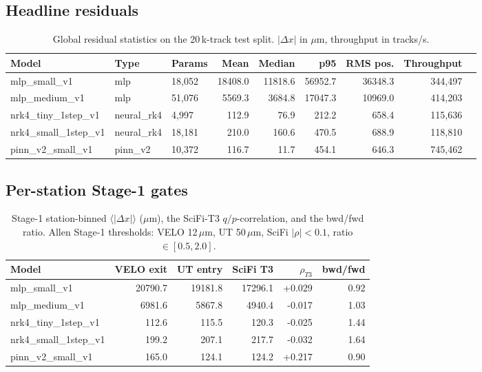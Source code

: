 \documentclass[11pt,a4paper]{article}
\begin{document}
\subsection{Headline residuals}
\begin{table}[h!]
\centering
\caption{Global residual statistics on the 20\,k-track test split.
$|\Delta x|$ in $\mu$m, throughput in tracks/s.}
\small
\begin{tabular}{lllrrrrrr}
\toprule
Model & Type & Params & Mean & Median & p95 & RMS pos. & Throughput \\
\midrule
mlp\_small\_v1 & mlp & 18,052 & 18408.0 & 11818.6 & 56952.7 & 36348.3 & 344,497 \\
mlp\_medium\_v1 & mlp & 51,076 & 5569.3 & 3684.8 & 17047.3 & 10969.0 & 414,203 \\
nrk4\_tiny\_1step\_v1 & neural\_rk4 & 4,997 & 112.9 & 76.9 & 212.2 & 658.4 & 115,636 \\
nrk4\_small\_1step\_v1 & neural\_rk4 & 18,181 & 210.0 & 160.6 & 470.5 & 688.9 & 118,810 \\
pinn\_v2\_small\_v1 & pinn\_v2 & 10,372 & 116.7 & 11.7 & 454.1 & 646.3 & 745,462 \\
\bottomrule
\end{tabular}
\end{table}

\subsection{Per-station Stage-1 gates}
\begin{table}[h!]
\centering
\caption{Stage-1 station-binned $\langle|\Delta x|\rangle$ ($\mu$m), the
SciFi-T3 $q/p$-correlation, and the bwd/fwd ratio.
Allen Stage-1 thresholds: VELO 12\,$\mu$m, UT 50\,$\mu$m,
SciFi $|\rho|<0.1$, ratio $\in[0.5,2.0]$.}
\small
\begin{tabular}{lrrrrr}
\toprule
Model & VELO exit & UT entry & SciFi T3 & $\rho_{T3}$ & bwd/fwd \\
\midrule
mlp\_small\_v1 & 20790.7 & 19181.8 & 17296.1 & +0.029 & 0.92 \\
mlp\_medium\_v1 & 6981.6 & 5867.8 & 4940.4 & -0.017 & 1.03 \\
nrk4\_tiny\_1step\_v1 & 112.6 & 115.5 & 120.3 & -0.025 & 1.44 \\
nrk4\_small\_1step\_v1 & 199.2 & 207.1 & 217.7 & -0.032 & 1.64 \\
pinn\_v2\_small\_v1 & 165.0 & 124.1 & 124.2 & +0.217 & 0.90 \\
\bottomrule
\end{tabular}
\end{table}
\end{document}
